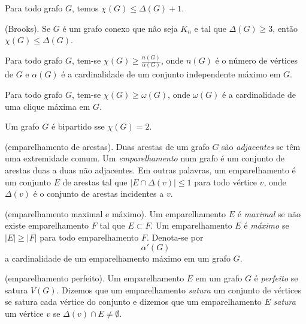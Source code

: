 \documentclass{article}
\begin{document}
\begin{thm}
    Para todo grafo \(G\), temos \(\chi(G) \leq \Delta(G) + 1\).
\end{thm}

\begin{thm} (Brooks).
    Se \(G\) é um grafo conexo que não seja \(K_n\) e tal que \(\Delta(G) \geq 3\), então \(\chi(G) \leq \Delta(G)\).
\end{thm}

\begin{thm}
    Para todo grafo \(G\), tem-se \(\chi(G) \geq \displaystyle \frac{n(G)}{\alpha(G)}\), onde \(n(G)\) é o número de vértices de \(G\) e \(\alpha(G)\) é a cardinalidade de um conjunto independente máximo em \(G\).
\end{thm}

\begin{thm}
    Para todo grafo \(G\), tem-se \(\chi(G) \geq \omega(G)\), onde \(\omega(G)\) é a cardinalidade de uma clique máxima em \(G\).
\end{thm}

\begin{thm}
    Um grafo \(G\) é bipartido sse \(\chi(G) = 2\).
\end{thm}

\begin{defn} (emparelhamento de arestas).
    Duas arestas de um grafo \(G\) são \emph{adjacentes} se têm uma extremidade comum. Um \emph{emparelhamento} num grafo é um conjunto de arestas duas a duas não adjacentes. Em outras palavras, um emparelhamento é um conjunto \(E\) de arestas tal que \(\vert E \cap \Delta(v) \vert \leq 1\) para todo vértice \(v\), onde \(\Delta(v)\) é o conjunto de arestas incidentes a \(v\).
\end{defn}

\begin{defn} (emparelhamento maximal e máximo).
    Um emparelhamento \(E\) é \emph{maximal} se não existe emparelhamento \(F\) tal que \(E \subset F\). Um emparelhamento \(E\) é \emph{máximo} se \(\vert E \vert \geq \vert F \vert\) para todo emparelhamento \(F\). Denota-se por
    \[
        \alpha'(G)
    \]
\noindent a cardinalidade de um emparelhamento máximo em um grafo \(G\).
\end{defn}

\begin{defn} (emparelhamento perfeito).
    Um emparelhamento \(E\) em um grafo \(G\) é \emph{perfeito} se satura \(V(G)\). Dizemos que um emparelhamento \emph{satura} um conjunto de vértices se satura cada vértice do conjunto e dizemos que um emparelhamento \(E\) \emph{satura} um vértice \(v\) se \(\Delta(v) \cap E \neq \emptyset\).
\end{defn}
\end{document}
